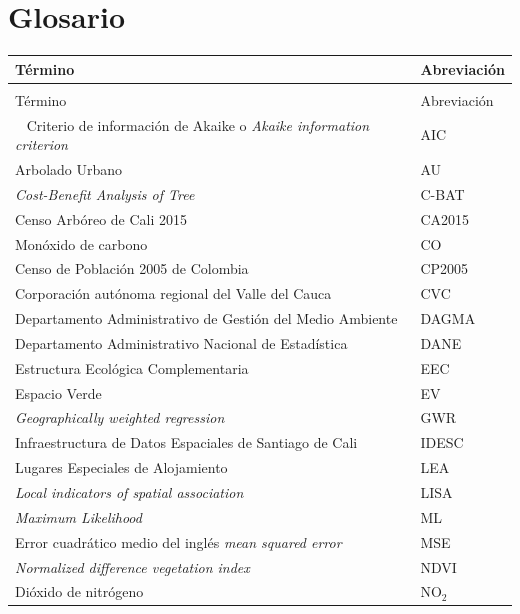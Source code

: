 \documentclass[12pt,a4paper,openany]{book}
\theoremstyle{definition}
\theoremstyle{definition}
\theoremstyle{definition}
\theoremstyle{remark}
\begin{document}

\chapter*{Glosario}\label{glosario}

\begin{longtable}{>{\raggedright\arraybackslash}p{10cm}l}
\toprule
Término & Abreviación\\
\midrule
\endfirsthead
\multicolumn{2}{@{}l}{\textit{(continúa)}}\\
\toprule
Término & Abreviación\\
\midrule
\endhead
\
\endfoot
\bottomrule
\endlastfoot
\rowcolor{gray!6}  Criterio de información de Akaike o \textit{Akaike information criterion} & AIC\\
Arbolado Urbano & AU\\
\rowcolor{gray!6}  \textit{Cost-Benefit Analysis of Tree} & C-BAT\\
Censo Arbóreo de Cali 2015 & CA2015\\
\rowcolor{gray!6}  Monóxido de carbono & CO\\
\addlinespace
Censo de Población 2005 de Colombia & CP2005\\
\rowcolor{gray!6}  Corporación autónoma regional del Valle del Cauca & CVC\\
Departamento Administrativo de Gestión del Medio Ambiente & DAGMA\\
\rowcolor{gray!6}  Departamento Administrativo Nacional de Estadística & DANE\\
Estructura Ecológica Complementaria & EEC\\
\addlinespace
\rowcolor{gray!6}  Espacio Verde & EV\\
\textit{Geographically weighted regression} & GWR\\
\rowcolor{gray!6}  Infraestructura de Datos Espaciales de Santiago de Cali & IDESC\\
Lugares Especiales de Alojamiento & LEA\\
\rowcolor{gray!6}  \textit{Local indicators of spatial association} & LISA\\
\addlinespace
\textit{Maximum Likelihood} & ML\\
\rowcolor{gray!6}  Error cuadrático medio del inglés \textit{mean squared error} & MSE\\
\textit{Normalized difference vegetation index} & NDVI\\
\rowcolor{gray!6}  Dióxido de nitrógeno & NO$_2$\\

\end{longtable}
\end{document}
